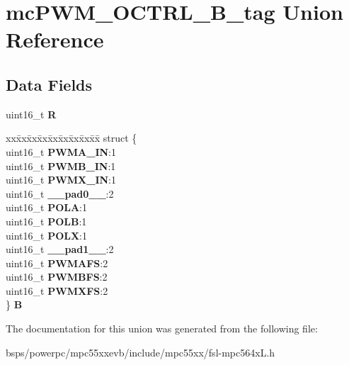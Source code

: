 \hypertarget{unionmcPWM__OCTRL__16B__tag}{}\section{mc\+P\+W\+M\+\_\+\+O\+C\+T\+R\+L\+\_\+B\+\_\+tag Union Reference}
\label{unionmcPWM__OCTRL__16B__tag}
\subsection*{Data Fields}
\begin{DoxyCompactItemize}
\item 
\mbox{\label{unionmcPWM__OCTRL__16B__tag_a3892677aa5872698f4d441f85b016c1d}} 
uint16\+\_\+t {\bfseries R}
\item 
\mbox{\label{unionmcPWM__OCTRL__16B__tag_af75c19c6688b6d738279ce10be22faf2}} 
\begin{tabbing}
xx\=xx\=xx\=xx\=xx\=xx\=xx\=xx\=xx\=\kill
struct \{\\
\>uint16\_t {\bfseries PWMA\_IN}:1\\
\>uint16\_t {\bfseries PWMB\_IN}:1\\
\>uint16\_t {\bfseries PWMX\_IN}:1\\
\>uint16\_t {\bfseries \_\_pad0\_\_}:2\\
\>uint16\_t {\bfseries POLA}:1\\
\>uint16\_t {\bfseries POLB}:1\\
\>uint16\_t {\bfseries POLX}:1\\
\>uint16\_t {\bfseries \_\_pad1\_\_}:2\\
\>uint16\_t {\bfseries PWMAFS}:2\\
\>uint16\_t {\bfseries PWMBFS}:2\\
\>uint16\_t {\bfseries PWMXFS}:2\\
\} {\bfseries B}\\

\end{tabbing}\end{DoxyCompactItemize}


The documentation for this union was generated from the following file\+:\begin{DoxyCompactItemize}
\item 
bsps/powerpc/mpc55xxevb/include/mpc55xx/fsl-\/mpc564x\+L.\+h\end{DoxyCompactItemize}
